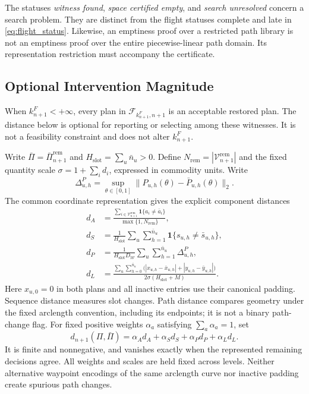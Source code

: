 The statuses \emph{witness found}, \emph{space certified empty}, and
\emph{search unresolved} concern a search problem. They are distinct from
the flight statuses complete and late in
\eqref{eq:flight_status}.
Likewise, an emptiness proof over a restricted path library is not an
emptiness proof over the entire piecewise-linear path domain. Its
representation restriction must accompany the certificate.

\balance
\subsection{Optional Intervention Magnitude}
\label{subsec:intervention_magnitude}

When $k_{n+1}^F<+\infty$, every plan in
$\mathcal F_{k_{n+1}^F,n+1}$ is an acceptable restored plan.
The distance below is optional for reporting or selecting among these
witnesses. It is not a feasibility constraint and does not alter
$k_{n+1}^F$.

Write $\bar\Pi=\bar\Pi_{n+1}^{\mathrm{rem}}$ and
$H_{\mathrm{slot}}=\sum_u\bar n_u>0$. Define
$N_{\mathrm{rem}}=|\mathcal V_{n+1}^{\mathrm{rem}}|$ and the fixed quantity
scale $\sigma=1+\sum_i d_i$, expressed in commodity units.
Write
\begin{equation*}
\Delta_{u,h}^{P}=\sup_{\theta\in[0,1]}
\|P_{u,h}(\theta)-\bar P_{u,h}(\theta)\|_2.
\end{equation*}
The common coordinate representation gives the explicit component distances
\begin{align}
d_A&=\frac{\sum_{i\in\mathcal V_{n+1}^{\mathrm{rem}}}
\mathbf 1\{a_i\ne\bar a_i\}}{\max\{1,N_{\mathrm{rem}}\}},
\label{eq:assignment_distance}\\
d_S&=\frac{1}{H_{\mathrm{slot}}}
\sum_u\sum_{h=1}^{\bar n_u}\mathbf 1\{s_{u,h}\ne\bar s_{u,h}\},
\label{eq:sequence_distance}\\
d_P&=\frac{1}{H_{\mathrm{slot}}D_{\mathcal W}}
\sum_u\sum_{h=1}^{\bar n_u}
\Delta_{u,h}^{P},
\label{eq:path_distance}\\
d_L&=\frac{\displaystyle\sum_u\sum_{h=0}^{\bar n_u}
\bigl(|x_{u,h}-\bar x_{u,h}|+|y_{u,h}-\bar y_{u,h}|\bigr)}
{2\sigma(H_{\mathrm{slot}}+M)}.
\label{eq:quantity_distance}
\end{align}
Here $x_{u,0}=0$ in both plans and all inactive entries use their
canonical padding. Sequence distance measures slot changes.
Path distance compares geometry under the fixed arclength convention,
including its endpoints; it is not a binary path-change flag.
For fixed positive weights $\alpha_a$ satisfying $\sum_a\alpha_a=1$, set
\begin{equation}
d_{n+1}(\Pi,\bar\Pi)=\alpha_A d_A+\alpha_S d_S+\alpha_P d_P+\alpha_L d_L.
\label{eq:intervention_distance}
\end{equation}
It is finite and nonnegative, and vanishes exactly when the represented
remaining decisions agree. All weights and scales are held fixed across
levels. Neither alternative waypoint encodings of the same arclength
curve nor inactive padding create spurious path changes.

